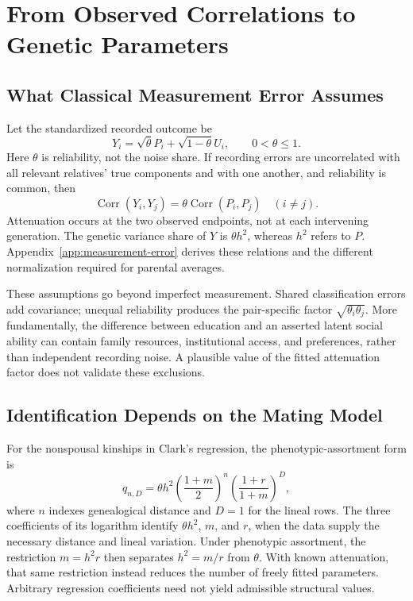 \section{From Observed Correlations to Genetic Parameters}
\label{sec:measurement-error}\label{sec:assortment-comparison}
\subsection{What Classical Measurement Error Assumes}
Let the standardized recorded outcome be
\[
 Y_i=\sqrt{\theta}P_i+\sqrt{1-\theta}U_i,
 \qquad 0<\theta\leq1.
\]
Here $\theta$ is reliability, not the noise share. If recording errors are
uncorrelated with all relevant relatives' true components and with one
another, and reliability is common, then
\[
 \operatorname{Corr}(Y_i,Y_j)=\theta\operatorname{Corr}(P_i,P_j)
 \quad(i\ne j).
\]
Attenuation occurs at the two observed endpoints, not at each intervening
generation. The genetic variance share of $Y$ is $\theta h^2$, whereas
$h^2$ refers to $P$. Appendix~\ref{app:measurement-error} derives these
relations and the different normalization required for parental averages.

These assumptions go beyond imperfect measurement. Shared classification
errors add covariance; unequal reliability produces the pair-specific
factor $\sqrt{\theta_i\theta_j}$. More fundamentally, the difference between
education and an asserted latent social ability can contain family resources,
institutional access, and preferences, rather than independent recording
noise. A plausible value of the fitted attenuation factor does not validate
these exclusions.

\subsection{Identification Depends on the Mating Model}
For the nonspousal kinships in Clark's regression, the phenotypic-assortment
form is
\[
 q_{n,D}=\theta h^2\left(\frac{1+m}{2}\right)^n
 \left(\frac{1+r}{1+m}\right)^D,
\]
where $n$ indexes genealogical distance and $D=1$ for the lineal rows.
The three coefficients of its logarithm identify $\theta h^2$, $m$, and
$r$, when the data supply the necessary distance and lineal variation.
Under phenotypic assortment, the restriction $m=h^2r$ then separates
$h^2=m/r$ from $\theta$. With known attenuation, that same restriction
instead reduces the number of freely fitted parameters. Arbitrary
regression coefficients need not yield admissible structural values.

